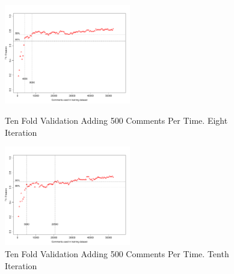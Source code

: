 \begin{figure}[thb!]
  \centering
  \vspace{-93mm}
  \includegraphics[width=0.49\textwidth]{figures/appendix/ten_fold_validation_requirement/ten_fold_validation_7_500.pdf}
  \vspace{-5mm}
  \caption{Ten Fold Validation Adding 500 Comments Per Time. Eight Iteration}
  \label{fig:requirement_ten_fold_validation_7_100}
  \includegraphics[width=0.49\textwidth]{figures/appendix/ten_fold_validation_requirement/ten_fold_validation_9_500.pdf}
  \vspace{-5mm}
  \caption{Ten Fold Validation Adding 500 Comments Per Time. Tenth Iteration}
  \label{fig:requirement_ten_fold_validation_9_100}
  
\end{figure}

        
